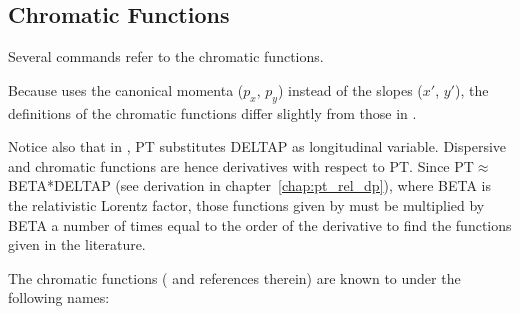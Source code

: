 \subsection{Chromatic Functions} 
\label{subsec:tables-chrom}
Several \madx commands refer to the chromatic functions. 

Because \madx uses the canonical momenta ($p_x$, $p_y$) instead of the
slopes ($x'$, $y'$), the definitions of the chromatic functions differ
slightly from those in \cite{Montague1979}.

Notice also that in \madx, PT substitutes DELTAP as longitudinal
variable. Dispersive and chromatic functions are hence derivatives with
respect to PT. 
Since PT$\approx$BETA*DELTAP (see derivation in chapter~\ref{chap:pt_rel_dp}), where BETA is the relativistic Lorentz 
factor, those functions given by \madx must be multiplied by BETA a
number of times equal to the order of the derivative to find the
functions given in the literature. 

The chromatic functions (\cite{Carli2022} and references therein) are known to \madx under the following names:

